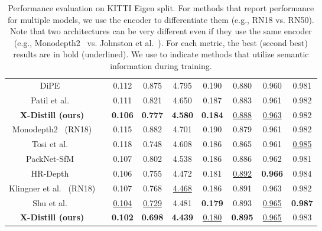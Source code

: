 \documentclass{bmvc2k}
\newcommand{\rev}{}
\begin{document}
\begin{table}[t!]
\begin{tabular}[h]{ c | c | c  c  c  c | c  c  c}
DiPE~\cite{jiang2020dipe} & &0.112 &0.875 &4.795 &0.190 &0.880 &0.960 &0.981\\

Patil et al.~\cite{patil2020don} & &0.111 &0.821 &4.650 &0.187 &0.883 &0.961 &0.982\\

\hdashline
\textbf{X-Distill (ours)} & &\textbf{0.106} &\textbf{0.777} &\textbf{4.580} &\textbf{0.184} &\underline{0.888} &\underline{0.963} &0.982 \\
\hline


Monodepth2~\cite{godard2019digging} (RN18) & &0.115 &0.882 &4.701 &0.190 &0.879 &0.961 &0.982 \\

Tosi et al.~\cite{tosi2020distilled} & &0.118 &0.748 &4.608 &0.186 &0.865 &0.961 &\underline{0.985}\\

PackNet-SfM~\cite{guizilini20203d} & &0.107 &0.802 &4.538 &0.186 &0.886 &0.962 &0.981 \\

HR-Depth~\cite{lyu2020hr} & &0.106 &0.755 &4.472 &0.181 &\underline{0.892} &\textbf{0.966} &0.984 \\

Klingner et al.~\cite{klingner2020self} (RN18) & &0.107 &0.768 &\underline{4.468} &0.186 &0.891 &0.963 &0.982 \\

Shu et al.~\cite{shu2020feature} & &\underline{0.104} &\underline{0.729} &4.481 &\textbf{0.179} &0.893 &\underline{0.965} &\textbf{0.987} \\

\hdashline
\textbf{X-Distill (ours)} & &\textbf{0.102} &\textbf{0.698} &\textbf{4.439} &\underline{0.180} &\textbf{0.895} &\underline{0.965} &0.983 \\

\hline
\end{tabular}
\vspace{5pt}
\caption{\small Performance evaluation on KITTI Eigen split. For methods that report performance for multiple models, we use the encoder to differentiate them (e.g., RN18 vs. RN50). Note that two architectures can be very different even if they use the same encoder (e.g., Monodepth2~\cite{godard2019digging} vs. Johnston et al.~\cite{johnston2020self}). For each metric, the best (second best) results are in bold (underlined). \rev{We use  to indicate methods that utilize semantic information during training.}}
\label{tab:results_kitti}
\vspace{-13pt}
\end{table}
\end{document}
